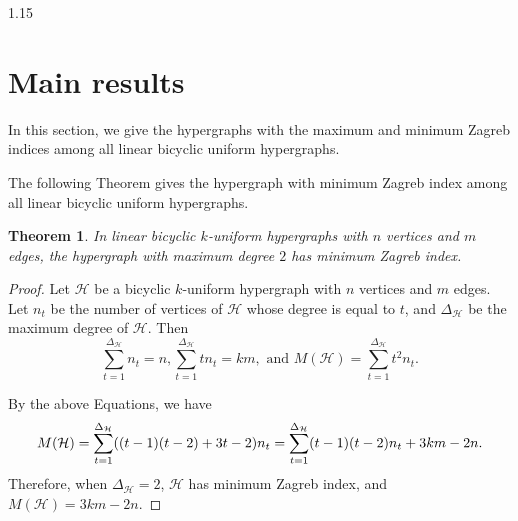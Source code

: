 \documentclass[preprint,12pt]{elsarticle1}
\newtheorem{thm}{Theorem}[section]
\newtheorem{lem}[thm]{Lemma}
\numberwithin{equation}{section}
\begin{document}
\begin{spacing}{1.15}




\section{Main results}

In this section,
we give the hypergraphs with the maximum and minimum Zagreb indices among all linear bicyclic uniform hypergraphs.


The following Theorem gives the hypergraph with minimum Zagreb index among all linear bicyclic uniform hypergraphs.
\begin{thm}
In linear bicyclic $k$-uniform hypergraphs with $n$ vertices and $m$ edges, the hypergraph with maximum degree $2$ has minimum Zagreb index.
\end{thm}
\begin{proof}
Let $\mathcal{H}$ be a bicyclic $k$-uniform hypergraph with $n$ vertices and $m$ edges. Let $n_{t}$ be the number of vertices of $\mathcal{H}$  whose degree is equal to $t$, and $\Delta_{\mathcal{H}}$ be the maximum degree of $\mathcal{H}$. Then
\begin{equation*}\label{zsyzh1}
\sum\limits_{t=1}^{\Delta_{\mathcal{H}}}n_{t}=n,\sum\limits_{t=1}^{\Delta_{\mathcal{H}}}tn_{t}=km, \text{~and~} M(\mathcal{H})=\sum\limits_{t=1}^{\Delta_{\mathcal{H}}}t^{2}n_{t}.
\end{equation*}


By the above Equations, we have
$$
M(\mathcal{H})%
=\sum\limits_{t=1}^{\Delta_{\mathcal{H}}}((t-1)(t-2)+3t-2)n_{t}
=\sum\limits_{t=1}^{\Delta_{\mathcal{H}}}(t-1)(t-2)n_{t}+3km-2n.\\
$$
Therefore, when $\Delta_{\mathcal{H}}=2$, $\mathcal{H}$ has minimum Zagreb index, and $M(\mathcal{H})=3km-2n$.


\end{proof}
\end{spacing}
\end{document}
